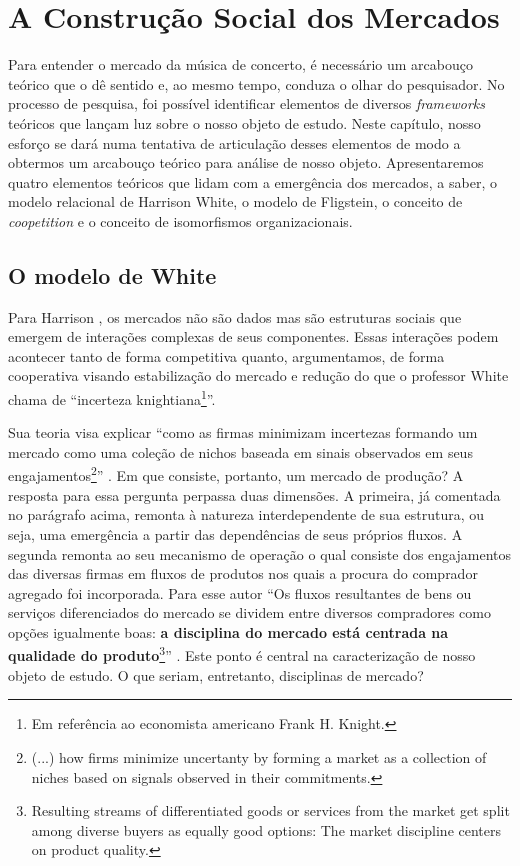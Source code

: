\documentclass[a4paper, 12pt, openright, oneside, german, french, english, brazil]{abntex2}
\begin{document}
	
	\chapter{A Construção Social dos Mercados}
	
	Para entender o mercado da música de concerto, é necessário um arcabouço teórico que o dê sentido e, ao mesmo tempo, conduza o olhar do pesquisador. No processo de pesquisa, foi possível identificar elementos de diversos \textit{frameworks} teóricos que lançam luz sobre o nosso objeto de estudo. Neste capítulo, nosso esforço se dará numa tentativa de articulação desses elementos de modo a obtermos um arcabouço teórico para análise de nosso objeto. Apresentaremos quatro elementos teóricos que lidam com a emergência dos mercados, a saber, o modelo relacional de Harrison White, o modelo de Fligstein, o conceito de \textit{coopetition} e o conceito de isomorfismos organizacionais.
	
	\section{O modelo de White}
	
	Para Harrison , os mercados não são dados mas são estruturas sociais que emergem de interações complexas de seus componentes. Essas interações podem acontecer tanto de forma competitiva quanto, argumentamos, de forma cooperativa visando estabilização do mercado e redução do que o professor White chama de ``incerteza knightiana\footnote{Em referência ao economista americano Frank H. Knight.}''.
	
	Sua teoria visa explicar ``como as firmas minimizam incertezas formando um mercado como uma coleção de nichos baseada em sinais observados em seus engajamentos\footnote{(...) how firms minimize uncertanty by forming a market as a collection of niches based on signals observed in their commitments.}'' \cite[p. xiii]{white2002markets}. Em que consiste, portanto, um mercado de produção? A resposta para essa pergunta perpassa duas dimensões. A primeira, já comentada no parágrafo acima, remonta à natureza interdependente de sua estrutura, ou seja, uma emergência a partir das dependências de seus próprios fluxos. A segunda remonta ao seu mecanismo de operação o qual consiste dos engajamentos das diversas firmas em fluxos de produtos nos quais a procura do comprador agregado foi incorporada. Para esse autor ``Os fluxos resultantes de bens ou serviços diferenciados do mercado se dividem entre diversos compradores como opções igualmente boas: \textbf{a disciplina do mercado está centrada na qualidade do produto}\footnote{Resulting streams of differentiated goods or services from the market get split among diverse buyers as equally good options: The market discipline centers on product quality.}'' \cite[p. 1, grifo meu]{white2002markets}. Este ponto é central na caracterização de nosso objeto de estudo. O que seriam, entretanto, disciplinas de mercado?
	
\end{document}
